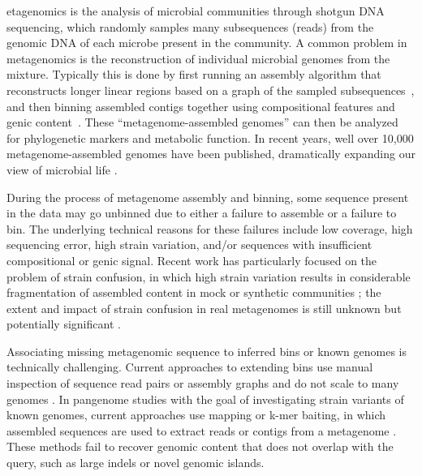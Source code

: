 etagenomics is the analysis of microbial communities through shotgun
DNA sequencing, which randomly samples many subsequences (reads)
from the genomic DNA of each microbe present in the community.
A common problem in metagenomics is the reconstruction of
individual microbial genomes from the mixture.
Typically this is
done by first running an assembly algorithm that reconstructs
longer linear regions based on a graph of the sampled
subsequences~\cite{pell2012scaling}, and then binning assembled
contigs together using compositional features and genic content~\cite{laczny2017busybee,lin2016accurate}.  These
``metagenome-assembled genomes'' can then be
analyzed for phylogenetic markers and metabolic function. In recent years,
well over 10,000 metagenome-assembled genomes have been published,
dramatically expanding our view of microbial life
\cite{Parks2017,Tully2018,Stewart2018,Delmont2018,Hug2016}.

During the process of metagenome assembly and binning, some
sequence present in the data may go unbinned due to either a failure
to assemble \cite{CAMI,Awad155358} or a failure to bin.
The underlying technical reasons for these failures include low
coverage, high sequencing error, high strain variation, and/or sequences
with insufficient compositional or genic signal.  Recent work has
particularly focused on the problem of strain confusion, in which
high strain variation results in considerable fragmentation of assembled
content in mock or synthetic communities \cite{CAMI,Awad155358}; the
extent and impact of strain confusion in real metagenomes is still unknown
but potentially significant \cite{brownstrain,Brito2016,baltic}.

Associating missing metagenomic sequence to inferred bins or known
genomes is technically challenging.  Current approaches to extending
bins use manual inspection of sequence read pairs or assembly graphs
and do not scale to many
genomes \cite{perchlorate,metacherchant}. In pangenome studies with the
goal of investigating strain variants of known genomes,
 current approaches use mapping or k-mer baiting, in which
assembled sequences are used to extract reads or contigs from a
metagenome \cite{desman,Nayfach2016,ekg,mspminer}.
These methods fail to recover genomic content that does not overlap with
the query, such as large indels or novel genomic islands.

